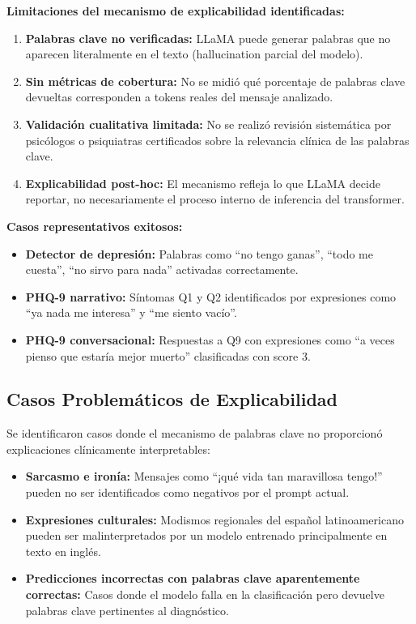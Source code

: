 \textbf{Limitaciones del mecanismo de explicabilidad identificadas:}
\begin{enumerate}
    \item \textbf{Palabras clave no verificadas:} LLaMA puede generar palabras que no
          aparecen literalmente en el texto (hallucination parcial del modelo).

    \item \textbf{Sin métricas de cobertura:} No se midió qué porcentaje de palabras clave
          devueltas corresponden a tokens reales del mensaje analizado.

    \item \textbf{Validación cualitativa limitada:} No se realizó revisión sistemática por
          psicólogos o psiquiatras certificados sobre la relevancia clínica de las
          palabras clave.

    \item \textbf{Explicabilidad post-hoc:} El mecanismo refleja lo que LLaMA decide
          reportar, no necesariamente el proceso interno de inferencia del transformer.
\end{enumerate}

\textbf{Casos representativos exitosos:}
\begin{itemize}
    \item \textbf{Detector de depresión:} Palabras como ``no tengo ganas'',
          ``todo me cuesta'', ``no sirvo para nada'' activadas correctamente.
    \item \textbf{PHQ-9 narrativo:} Síntomas Q1 y Q2 identificados por expresiones como
          ``ya nada me interesa'' y ``me siento vacío''.
    \item \textbf{PHQ-9 conversacional:} Respuestas a Q9 con expresiones como
          ``a veces pienso que estaría mejor muerto'' clasificadas con score 3.
\end{itemize}

\subsection{Casos Problemáticos de Explicabilidad}

Se identificaron casos donde el mecanismo de palabras clave no proporcionó
explicaciones clínicamente interpretables:

\begin{itemize}
    \item \textbf{Sarcasmo e ironía:} Mensajes como ``¡qué vida tan maravillosa tengo!''
          pueden no ser identificados como negativos por el prompt actual.

    \item \textbf{Expresiones culturales:} Modismos regionales del español
          latinoamericano pueden ser malinterpretados por un modelo entrenado
          principalmente en texto en inglés.

    \item \textbf{Predicciones incorrectas con palabras clave aparentemente correctas:}
          Casos donde el modelo falla en la clasificación pero devuelve palabras clave
          pertinentes al diagnóstico.
\end{itemize}

